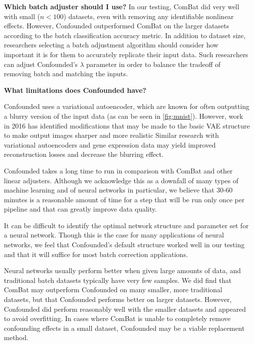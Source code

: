 \documentclass[11pt]{article}
\begin{document}
\textbf{Which batch adjuster should I use?}
In our testing, ComBat did very well with small ($n < 100$) datasets, even with removing any identifiable nonlinear effects.
However, Confounded outperformed ComBat on the larger datasets according to the batch classification accuracy metric.
In addition to dataset size, researchers selecting a batch adjustment algorithm should consider how important it is for them to accurately replicate their input data.
Such researchers can adjust Confounded's $\lambda$ parameter in order to balance the tradeoff of removing batch and matching the inputs.

\textbf{What limitations does Confounded have?}
\begin{enumerate*}[(a)]
	\item Confounded uses a variational autoencoder, which are known for often outputting a blurry version of the input data (as can be seen in \figurename{} \ref{fig:mnist}).
	However, work in 2016 has identified modifications that may be made to the basic VAE structure to make output images sharper and more realistic \citep{hou_deep_2016}
	Similar research with variational autoencoders and gene expression data may yield improved reconstruction losses and decrease the blurring effect.
	\item Confounded takes a long time to run in comparison with ComBat and other linear adjusters.
	Although we acknowledge this as a downfall of many types of machine learning and of neural networks in particular, we believe that 30-60 minutes is a reasonable amount of time for a step that will be run only once per pipeline and that can greatly improve data quality.
	\item It can be difficult to identify the optimal network structure and parameter set for a neural network.
	Though this is the case for many applications of neural networks, we feel that Confounded's default structure worked well in our testing and that it will suffice for most batch correction applications.
	\item Neural networks usually perform better when given large amounts of data, and traditional batch datasets typically have very few samples.
	We did find that ComBat may outperform Confounded on many smaller, more traditional datasets, but that Confounded performs better on larger datasets.
	However, Confounded did perform reasonably well with the smaller datasets and appeared to avoid overfitting.
	In cases where ComBat is unable to completely remove confounding effects in a small dataset, Confounded may be a viable replacement method.
\end{enumerate*}
\end{document}

